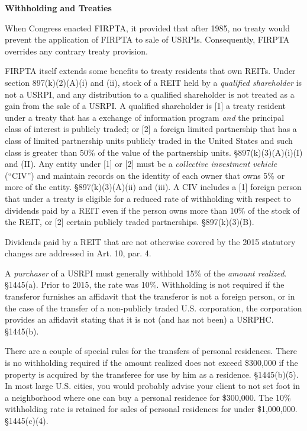 \begin{center}
\textbf{Withholding and Treaties}
\end{center}

When Congress enacted FIRPTA, it provided that after 1985, no treaty would prevent the application of FIRPTA to sale of USRPIs.  Consequently, FIRPTA overrides any contrary treaty provision.  

FIRPTA itself extends some benefits to treaty residents that own REITs.  Under section 897(k)(2)(A)(i) and (ii), stock of a REIT held by a \emph{qualified shareholder} is not a USRPI, and any distribution to a qualified shareholder is not treated as a gain from the sale of a USRPI.    A qualified shareholder is [1] a treaty resident under a treaty that has a exchange of information program \emph{and} the principal class of interest is publicly traded; or [2] a foreign limited partnership that has a class of limited partnership units publicly traded in the United States and such class is greater than 50\% of the value of the partnership units.  \S 897(k)(3)(A)(i)(I) and (II).  Any entity under [1] or [2] must be a \emph{collective investment vehicle} (``CIV'') and maintain records on the identity of each owner that owns 5\% or more of the entity. \S 897(k)(3)(A)(ii) and (iii).   A CIV includes a [1] foreign person that under a treaty is eligible for a reduced rate of withholding with respect to dividends paid by a REIT even if the person owns more than 10\% of the stock of the REIT, or [2] certain publicly traded partnerships. \S 897(k)(3)(B).

Dividends paid by a REIT that are not otherwise covered by the 2015 statutory changes are addressed in Art. 10, par. 4.

A \emph{purchaser} of a USRPI must generally withhold 15\% of the \emph{amount realized}. \S 1445(a).  Prior to 2015, the rate was 10\%.   Withholding is not required if the transferor furnishes an affidavit that the transferor is not a foreign person, or in the case of the transfer of a non-publicly traded U.S. corporation, the corporation provides an affidavit stating that it is not (and has not been) a USRPHC. \S 1445(b).  

There are a couple of special rules for the transfers of personal residences.  There is no withholding required if the amount realized does not exceed \$300,000 if the property is acquired by the transferee for use by him as a residence. \S 1445(b)(5).  In most large U.S. cities, you would probably advise your client to not set foot in a neighborhood where one can buy a personal residence for \$300,000.  The 10\% withholding rate is retained for sales of personal residences for under \$1,000,000.  \S 1445(c)(4).  


